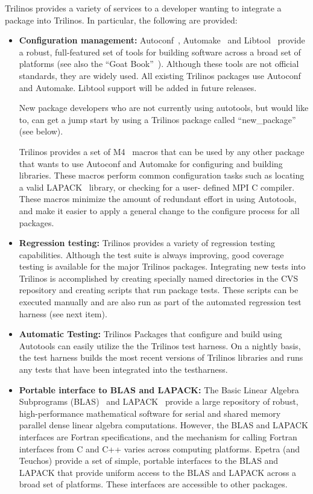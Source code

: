 \documentclass[acmtoms,acmnow]{acmtrans2m}
\begin{document}
Trilinos provides a variety of services to a developer wanting to
integrate a package into Trilinos.  In particular, the following are
provided:
\begin{itemize}
\item {\bf Configuration management:}
Autoconf~\cite{Autoconf},  Automake~\cite{Automake} and
Libtool~\cite{Libtool} provide a robust, full-featured set of tools for
building software across a broad set of platforms (see also the ``Goat
Book''~\cite{GoatBook}).  Although these
tools are not official standards, they are widely used.  All existing
Trilinos packages use Autoconf and Automake.  Libtool support will be
added in future releases. 

New package developers who are not currently using autotools, but would like
to, can get a jump start by using a Trilinos package called
``new\_package'' (see below). 

Trilinos provides a set of M4~\cite{M4} macros that can be used by any other
package that wants to use Autoconf and Automake for configuring and
building libraries.  These macros perform common configuration tasks such as
locating a valid LAPACK~\cite{lapack} library, or checking for a user-
defined MPI C compiler.  These macros minimize the amount of redundant
 effort in using Autotools, and make it easier to apply a general change to
the configure process for all packages.

\item {\bf Regression testing:} Trilinos provides a variety of regression
testing capabilities.  Although the test suite is always improving,
good coverage testing is available for the major Trilinos packages.
Integrating new tests into Trilinos is accomplished by creating
specially named directories in the CVS repository and creating scripts
that run package tests.  These scripts can be executed manually and
are also run as part of the automated regression test harness (see
next item).

\item {\bf Automatic Testing:} Trilinos Packages that configure and build using 
Autotools can easily utilize the the Trilinos test harness.  On a nightly 
basis, the test harness builds the most recent versions of Trilinos libraries 
and runs any tests that have been integrated into the testharness.  

\item {\bf Portable interface to BLAS and LAPACK:} The Basic Linear Algebra
Subprograms (BLAS)~\cite{BLAS1,BLAS2,BLAS3} and LAPACK~\cite{lapack}
provide a large repository of robust, high-performance mathematical
software for serial and shared memory parallel dense linear algebra
computations.  However, the BLAS and LAPACK interfaces are Fortran
specifications, and the mechanism for calling Fortran interfaces from
C and C++ varies across computing platforms.  Epetra (and Teuchos)
provide a set of simple, portable interfaces to the BLAS and LAPACK
that provide uniform access to the BLAS and LAPACK across a broad
set of platforms.  These interfaces are accessible to
other packages.


\end{itemize}
\end{document}
